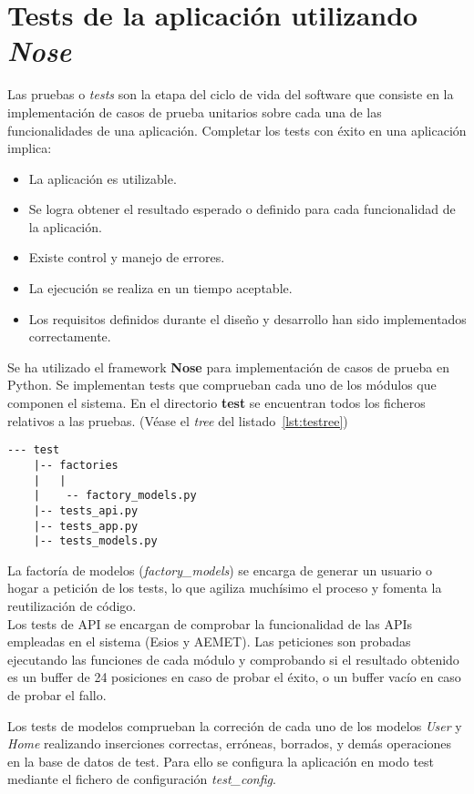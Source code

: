 \chapter{Tests de la aplicación utilizando \textit{Nose}}
\label{cap:AnexoB}
Las pruebas o \textit{tests} son la etapa del ciclo de vida del software que consiste en la implementación de casos de prueba unitarios sobre cada una de las funcionalidades de una aplicación. Completar los tests con éxito en una aplicación implica:
\begin{itemize}
\item La aplicación es utilizable.
\item Se logra obtener el resultado esperado o definido para cada funcionalidad de la aplicación.
\item Existe control y manejo de errores.
\item La ejecución se realiza en un tiempo aceptable.
\item Los requisitos definidos durante el diseño y desarrollo han sido implementados correctamente.
\end{itemize}

Se ha utilizado el framework \textbf{Nose} para implementación de casos de prueba en Python. Se implementan tests que comprueban cada uno de los módulos que componen el sistema. En el directorio \textbf{test} se encuentran todos los ficheros relativos a las pruebas. (Véase el \textit{tree} del listado~\ref{lst:testree})
\begin{lstlisting}[numbers=none,caption={Estructura del directorio \textit{test}},label={lst:testree}]
 --- test
    |-- factories
    |   |
    |    -- factory_models.py
    |-- tests_api.py
    |-- tests_app.py
    |-- tests_models.py
\end{lstlisting}

La factoría de modelos (\textit{factory\_models}) se encarga de generar un usuario o hogar a petición de los tests, lo que agiliza muchísimo el proceso y fomenta la reutilización de código.\\

Los tests de API se encargan de comprobar la funcionalidad de las APIs empleadas en el sistema (Esios y AEMET). Las peticiones son probadas ejecutando las funciones de cada módulo y comprobando si el resultado obtenido es un buffer de 24 posiciones en caso de probar el éxito, o un buffer vacío en caso de probar el fallo.

Los tests de modelos comprueban la correción de cada uno de los modelos \textit{User} y \textit{Home} realizando inserciones correctas, erróneas, borrados, y demás operaciones en la base de datos de test. Para ello se configura la aplicación en modo test mediante el fichero de configuración \textit{test\_config}.

